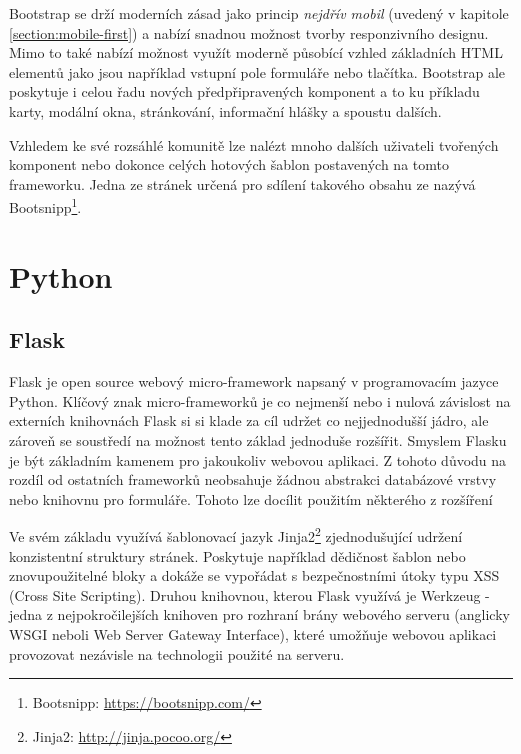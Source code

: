 Bootstrap se drží moderních zásad jako princip \emph{nejdřív mobil} (uvedený v kapitole \ref{section:mobile-first}) a nabízí snadnou možnost tvorby responzivního designu. Mimo to také nabízí možnost využít moderně působící vzhled základních HTML elementů jako jsou například vstupní pole formuláře nebo tlačítka. Bootstrap ale poskytuje i celou řadu nových předpřipravených komponent a to ku příkladu karty, modální okna, stránkování, informační hlášky a spoustu dalších.

Vzhledem ke své rozsáhlé komunitě lze nalézt mnoho dalších uživateli tvořených komponent nebo dokonce celých hotových šablon postavených na tomto frameworku. Jedna ze stránek určená pro sdílení takového obsahu ze nazývá Bootsnipp\footnote{Bootsnipp: \url{https://bootsnipp.com/}}.

\blindtext[2]



\section{Python}
\blindtext[2]

\subsection{Flask}
Flask je open source webový micro-framework napsaný v programovacím jazyce Python. Klíčový znak micro-frameworků je co nejmenší nebo i nulová závislost na externích knihovnách %
Flask si si klade za cíl udržet co nejjednodušší jádro, ale zároveň se soustředí na možnost tento základ jednoduše rozšířit.
Smyslem Flasku je být základním kamenem pro jakoukoliv webovou aplikaci. Z tohoto důvodu na rozdíl od ostatních frameworků neobsahuje žádnou abstrakci databázové vrstvy nebo knihovnu pro formuláře. Tohoto lze docílit použitím některého z rozšíření %

Ve svém základu využívá šablonovací jazyk Jinja2\footnote{Jinja2: \url{http://jinja.pocoo.org/}} zjednodušující udržení konzistentní struktury stránek. Poskytuje například dědičnost šablon nebo znovupoužitelné bloky a dokáže se vypořádat s bezpečnostními útoky typu XSS (Cross Site Scripting). %
Druhou knihovnou, kterou Flask využívá je Werkzeug - jedna z nejpokročilejších knihoven pro rozhraní brány webového serveru (anglicky WSGI neboli Web Server Gateway Interface), které umožňuje webovou aplikaci provozovat nezávisle na technologii použité na serveru. %

